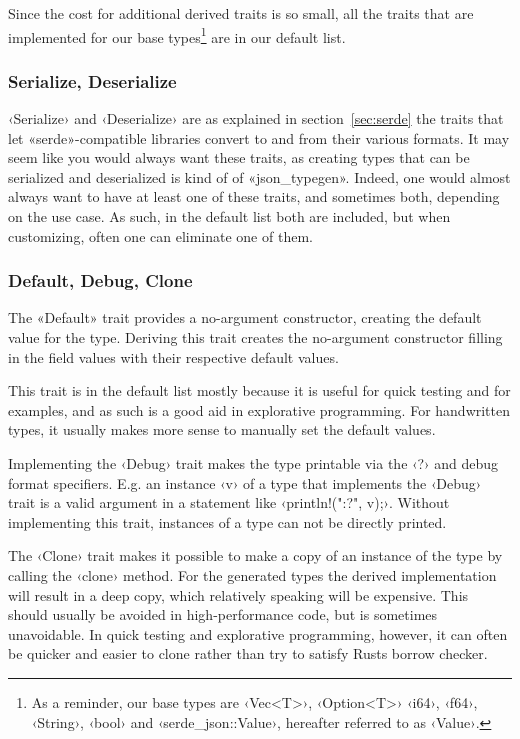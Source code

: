 Since the cost for additional derived traits is so small, all the traits that are implemented for our base types\footnote{As a reminder, our base types are ‹Vec<T>›, ‹Option<T>› ‹i64›, ‹f64›, ‹String›, ‹bool› and ‹serde_json::Value›, hereafter referred to as ‹Value›.} are in our default list.

\subsubsection{Serialize, Deserialize}

‹Serialize› and ‹Deserialize› are as explained in section~\ref{sec:serde} the traits that let «serde»-compatible libraries convert to and from their various formats. It may seem like you would always want these traits, as creating types that can be serialized and deserialized is kind of  of «json_typegen». Indeed, one would almost always want to have at least one of these traits, and sometimes both, depending on the use case. As such, in the default list both are included, but when customizing, often one can eliminate one of them. %


\subsubsection{Default, Debug, Clone}

The «Default» trait provides a no-argument constructor, creating the default value for the type. Deriving this trait creates the no-argument constructor filling in the field values with their respective default values.

This trait is in the default list mostly because it is useful for quick testing and for examples, and as such is a good aid in explorative programming. For handwritten types, it usually makes more sense to manually set the default values.

Implementing the ‹Debug› trait makes the type printable via the ‹?› and  debug format specifiers. E.g. an instance ‹v› of a type that implements the ‹Debug› trait is a valid argument in a statement like ‹println!("{:?}", v);›. Without implementing this trait, instances of a type can not be directly printed.

The ‹Clone› trait makes it possible to make a copy of an instance of the type by calling the ‹clone› method. For the generated types the derived implementation will result in a deep copy, which relatively speaking will be expensive. This should usually be avoided in high-performance code, but is sometimes unavoidable. In quick testing and explorative programming, however, it can often be quicker and easier to clone rather than try to satisfy Rusts borrow checker.

